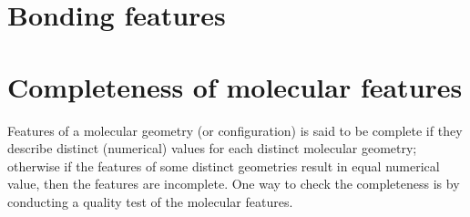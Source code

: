 \documentclass[12pt]{article}
\begin{document}
\section{Bonding features}
\label{sec:bondingfeature}

\section{Completeness of molecular features}
Features of a molecular geometry (or configuration) is said to be complete if they describe distinct (numerical) values for each distinct molecular geometry; otherwise if the features of some distinct geometries result in equal numerical value, then the features are incomplete. One way to check the completeness is by conducting a quality test of the molecular features.
\end{document}
